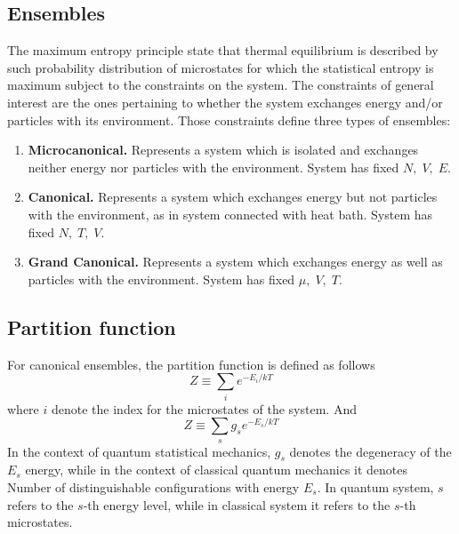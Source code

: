 \documentclass[../../../Main.tex]{subfiles}
\begin{document}
\subsection{Ensembles}
The maximum entropy principle state that thermal equilibrium is described by such probability distribution of microstates for which the statistical entropy is maximum subject to the constraints on the system.
The constraints of general interest are the ones pertaining to whether the system exchanges energy and/or particles with its environment.
Those constraints define three types of ensembles:
\begin{enumerate}
	\item \textbf{Microcanonical.} Represents a system which is isolated and exchanges neither energy nor particles with the environment. System has fixed $N,\;V,\;E$.
	\item \textbf{Canonical.} Represents a system which exchanges energy but not particles with the environment, as in system connected with heat bath. System has fixed $N,\;T,\;V$.
	\item \textbf{Grand Canonical.} Represents a system which exchanges energy as well as particles with the environment. System has fixed $\mu,\;V,\;T$.
\end{enumerate}

\subsection{Partition function}
For canonical ensembles, the partition function is defined as follows
\begin{equation*}
	Z\equiv \sum_i e^{-E_i/kT}
\end{equation*}
where $i$ denote the index for the microstates of the system.
And
\begin{equation*}
	Z\equiv \sum_{s} g_se^{-E_s/kT}
\end{equation*}
In the context of quantum statistical mechanics, $g_s$ denotes the degeneracy of the $E_s$ energy, while in the context of classical quantum mechanics it denotes Number of distinguishable configurations with energy $E_s$. In quantum system, $s$ refers to the $s$-th energy level, while in classical system it refers to the $s$-th microstates.
\end{document}

